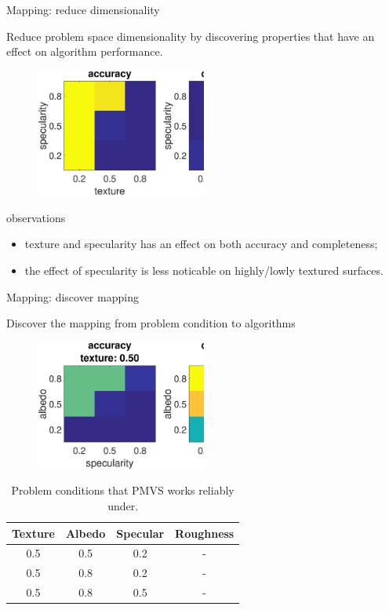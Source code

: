 \documentclass[10pt]{beamer}
\begin{document}
\begin{frame}{Mapping: reduce dimensionality}

Reduce problem space dimensionality by discovering properties that have an effect on algorithm performance.
\begin{figure}
\centering
\includegraphics[width=0.5\textwidth]{mapping/eval_prop/mvs_tex_spec}
\end{figure}

\begin{exampleblock}{observations}
\begin{itemize}
\item texture and specularity has an effect on both accuracy and completeness;
\item the effect of specularity is less noticable on highly/lowly textured surfaces.
\end{itemize}
\end{exampleblock}

\end{frame}

\begin{frame}{Mapping: discover mapping}

Discover the mapping from problem condition to algorithms
\begin{figure}
\centering
\includegraphics[width=0.5\textwidth]{mapping/lookup_table/mvs_texture_05}
\end{figure}

\begin{table}
\centering
\begin{tabular}{*{4}{c}}
\toprule
Texture & Albedo & Specular & Roughness\\
\midrule
0.5 & 0.5 & 0.2 & -\\
0.5 & 0.8 & 0.2 & -\\
0.5 & 0.8 & 0.5 & -\\
\bottomrule
\end{tabular}
\caption{Problem conditions that PMVS works reliably under.}
\end{table}

\end{frame}
\end{document}

